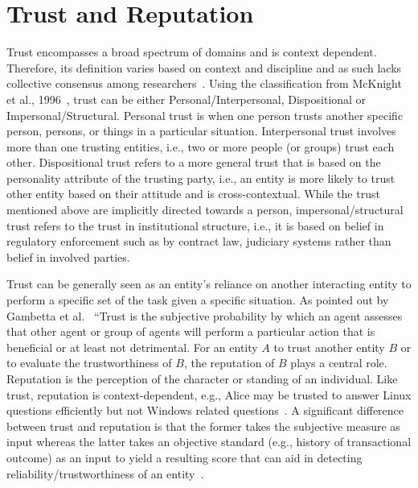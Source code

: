 \section{Trust and Reputation}
Trust encompasses a broad spectrum of domains and is context dependent.
Therefore, its definition varies based on context and discipline and as such
lacks collective consensus among researchers~\cite{mcknight1996meanings}.
Using the classification from McKnight et al., 1996~\cite{mcknight2001trust},
trust can be either Personal/Interpersonal, Dispositional or
Impersonal/Structural. Personal trust is when one person trusts another
specific person, persons, or things in a particular situation. Interpersonal
trust involves more than one trusting entities, i.e., two or more people (or
groups) trust each other. Dispositional trust refers to a more general trust
that is based on the personality attribute of the trusting party, i.e., an
entity is more likely to trust other entity based on their attitude and is
cross-contextual. While the trust mentioned above are implicitly directed
towards a person, impersonal/structural trust refers to the trust in
institutional structure, i.e., it is based on belief in regulatory enforcement
such as by contract law, judiciary systems rather than belief in involved
parties. \par

Trust can be generally seen as an entity's reliance on another interacting
entity to perform a specific set of the task given a specific situation. As
pointed out by Gambetta et al.~\cite{gambetta2000can} ``Trust is the subjective
probability by which an agent assesses that other agent or group of agents will
perform a particular action that is beneficial or at least not detrimental. For
an entity $A$ to trust another entity $B$ or to evaluate the trustworthiness of
$B$, the reputation of $B$ plays a central role. Reputation is the perception
of the character or standing of an individual. Like trust, reputation is
context-dependent, e.g., Alice may be trusted to answer Linux questions
efficiently but not Windows related questions~\cite{zacharia2000collaborative}.
A significant difference between trust and reputation is that the former takes
the subjective measure as input whereas the latter takes an objective standard
(e.g., history of transactional outcome) as an input to yield a resulting score
that can aid in detecting reliability/trustworthiness of an
entity~\cite{Sabater2005,castelfranchi2000trust}.\par

